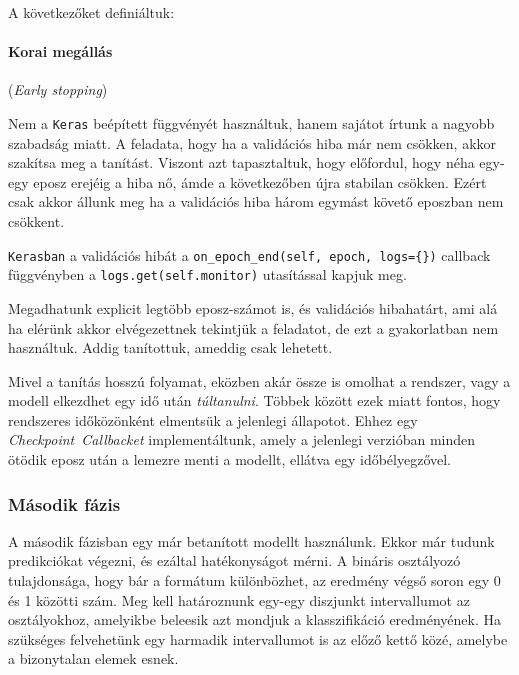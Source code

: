 \noindent
A következőket definiáltuk:

\paragraph{Korai megállás} (\textit{Early stopping})

Nem a \texttt{Keras} beépített függvényét használtuk, hanem sajátot írtunk a
nagyobb szabadság miatt. A feladata, hogy ha a validációs hiba már nem csökken, akkor 
szakítsa meg a tanítást. Viszont azt tapasztaltuk, hogy előfordul, hogy néha
egy-egy eposz erejéig a hiba nő, ámde a következőben újra stabilan csökken.
Ezért csak akkor állunk meg ha a validációs hiba három egymást követő eposzban
nem csökkent.

\texttt{Kerasban} a validációs hibát a \texttt{on\_epoch\_end(self, epoch, logs=\{\})} 
callback függvényben a \texttt{logs.get(self.monitor)} utasítással kapjuk meg.

Megadhatunk explicit legtöbb eposz-számot is, és validációs hibahatárt, ami alá ha
elérünk akkor elvégezettnek tekintjük a feladatot, de ezt a gyakorlatban nem használtuk.
Addig tanítottuk, ameddig csak lehetett.


Mivel a tanítás hosszú folyamat, eközben akár össze is omolhat a rendszer, vagy
a modell elkezdhet egy idő után \textit{túltanulni}. Többek között ezek miatt fontos,
hogy rendszeres időközönként elmentsük a jelenlegi állapotot. Ehhez egy 
\textit{Checkpoint~Callbacket} implementáltunk, amely a jelenlegi verzióban minden ötödik
eposz után a lemezre menti a modellt, ellátva egy időbélyegzővel.



\subsubsection{Második fázis}
\label{sec:masodik.fazis}

A második fázisban egy már betanított modellt használunk. Ekkor már tudunk predikciókat 
végezni, és ezáltal hatékonyságot mérni. A bináris osztályozó tulajdonsága, hogy bár
a formátum különbözhet, az eredmény végső soron egy 0 és 1 közötti szám. Meg kell 
határoznunk egy-egy diszjunkt intervallumot az osztályokhoz, amelyikbe beleesik azt mondjuk
a klasszifikáció eredményének. Ha szükséges felvehetünk egy harmadik intervallumot is 
az előző kettő közé, amelybe a bizonytalan elemek esnek.


